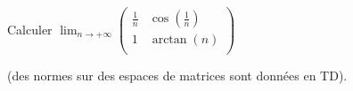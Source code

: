 \documentclass[french,11pt,twoside]{VcCours}
\begin{document}
%
%
%
%
%
%
%
%
%
%
%

\begin{ApplicationDirecte}{} Calculer $\lim_{n \rightarrow + \infty} \begin{pmatrix}
\frac{1}{n} & \cos \left( \frac{1}{n} \right) \\
1 & \arctan(n) \\
\end{pmatrix}$

(des normes sur des espaces de matrices sont données en TD).
\end{ApplicationDirecte}
\end{document}

